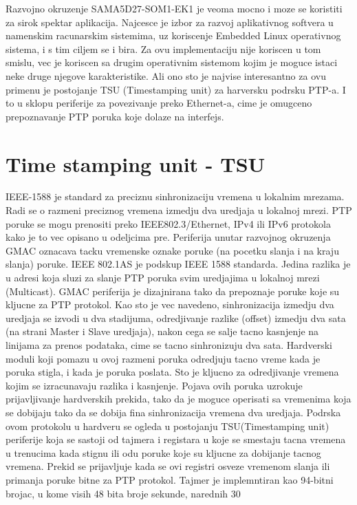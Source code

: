 \documentclass[a4paper,12pt, master]{etf}
\begin{document}
	Razvojno okruzenje SAMA5D27-SOM1-EK1 je veoma mocno i moze se koristiti za sirok spektar
	aplikacija. Najcesce je izbor za razvoj aplikativnog softvera u namenskim racunarskim
	sistemima, uz koriscenje Embedded Linux operativnog sistema, i s tim ciljem se i bira. Za ovu
	implementaciju nije koriscen u tom smislu, vec je koriscen sa drugim operativnim sistemom kojim
	je moguce istaci neke druge njegove karakteristike. Ali ono sto je najvise interesantno za ovu
	primenu je postojanje TSU (Timestamping unit) za harversku podrsku PTP-a. I to u sklopu
	periferije za povezivanje preko Ethernet-a, cime je omugceno prepoznavanje PTP poruka koje
	dolaze na interfejs.

	\section{Time stamping unit - TSU}
	IEEE-1588 je standard za preciznu sinhronizaciju vremena u lokalnim mrezama. Radi se o razmeni
	preciznog vremena izmedju dva uredjaja u lokalnoj mrezi. PTP poruke se mogu prenositi preko
	IEEE802.3/Ethernet, IPv4 ili IPv6 protokola kako je to vec opisano u odeljcima pre. Periferija
	unutar razvojnog okruzenja GMAC oznacava tacku vremenske oznake poruke (na pocetku slanja i na
	kraju slanja) poruke. IEEE 802.1AS je podskup IEEE 1588 standarda. Jedina razlika je u adresi
	koja sluzi za slanje PTP poruka svim uredjajima u lokalnoj mrezi (Multicast). GMAC periferija
	je dizajnirana tako da prepoznaje poruke koje su kljucne za PTP protokol. Kao sto je vec
	navedeno, sinhronizacija izmedju dva uredjaja se izvodi u dva stadijuma, odredjivanje razlike
	(offset) izmedju dva sata (na strani Master i Slave uredjaja), nakon cega se salje tacno
	kasnjenje na linijama za prenos podataka, cime se tacno sinhronizuju dva sata. Hardverski
	moduli koji pomazu u ovoj razmeni poruka odredjuju tacno vreme kada je poruka stigla, i kada je
	poruka poslata. Sto je kljucno za odredjivanje vremena kojim se izracunavaju razlika i
	kasnjenje. Pojava ovih poruka uzrokuje prijavljivanje hardverskih prekida, tako da je moguce
	operisati sa vremenima koja se dobijaju tako da se dobija fina sinhronizacija vremena dva
	uredjaja.
	Podrska ovom protokolu u hardveru se ogleda u postojanju TSU(Timestamping unit) periferije koja
	se sastoji od tajmera i registara u koje se smestaju tacna vremena u trenucima kada stignu ili
	odu poruke koje su kljucne za dobijanje tacnog vremena. Prekid se prijavljuje kada se ovi
	registri osveze vremenom slanja ili primanja poruke bitne za PTP protokol.
	Tajmer je implemntiran kao 94-bitni brojac, u kome visih 48 bita broje sekunde, narednih 30
\end{document}
